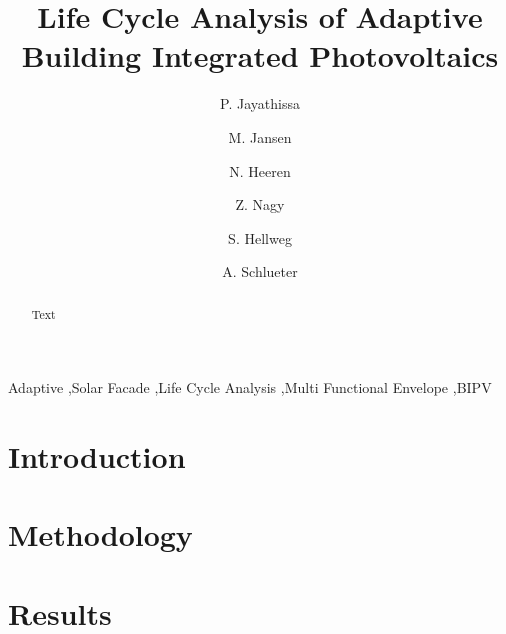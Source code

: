 \documentclass[preprint,12pt]{elsarticle} %
\begin{document}
\begin{frontmatter}

\title{Life Cycle Analysis of Adaptive Building Integrated Photovoltaics} 


\author[ita]{P. Jayathissa }

\author[ita]{M. Jansen}

\author[baug]{N. Heeren}

\author[ita]{Z. Nagy}

\author[baug]{S. Hellweg}


\author[ita]{A. Schlueter  }



\address[ita]{Architecture and Building Systems, Institute of Technology in Architecture,\\ ETH Zurich, Switzerland} 
\address[baug]{Ecological System Design, Institute of Environmental Engineering,\\ ETH Zurich, Switzerland}

\begin{abstract}
Text 
\end{abstract}

\begin{keyword}
Adaptive \sep Solar Facade \sep Life Cycle Analysis \sep Multi Functional Envelope \sep BIPV
\end{keyword}

\end{frontmatter}

\section{Introduction}
\label{ch:introduction}


\section{Methodology}
\label{ch:method}


\section{Results}
\label{ch:results}


\end{document}
